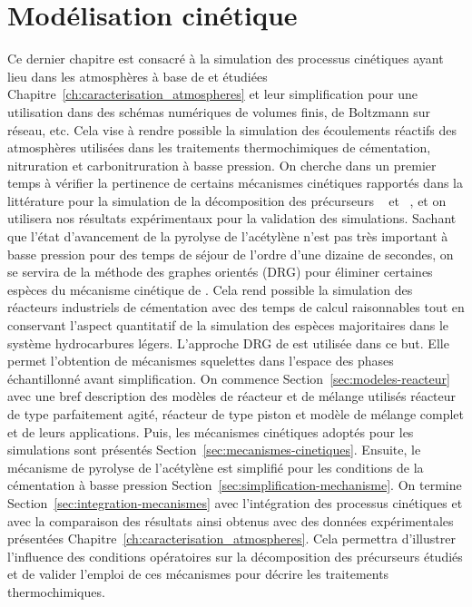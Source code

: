 \chapter{Modélisation cinétique}
\label{ch:modelisation_cinetique}

\vfill

Ce dernier chapitre est consacré à la simulation des processus cinétiques ayant lieu dans les atmosphères à base de  et  étudiées Chapitre~\ref{ch:caracterisation_atmospheres} et leur simplification pour une utilisation dans des schémas numériques de volumes finis, de Boltzmann sur réseau, etc. Cela vise à rendre possible la simulation des écoulements réactifs des atmosphères utilisées dans les traitements thermochimiques de cémentation, nitruration et carbonitruration à basse pression. On cherche dans un premier temps à vérifier la pertinence de certains mécanismes cinétiques rapportés dans la littérature pour la simulation de la décomposition des précurseurs ~\cite{Norinaga2009} et ~\cite{Dirtu2006}, et on utilisera nos résultats expérimentaux pour la validation des simulations. Sachant que l'état d'avancement de la pyrolyse de l'acétylène n'est pas très important à basse pression pour des temps de séjour de l'ordre d'une dizaine de
secondes, on se servira de la méthode des \og{}graphes orientés\fg{} (DRG) pour éliminer certaines espèces du mécanisme cinétique de \citet{Norinaga2009}. Cela rend possible la simulation des réacteurs industriels de cémentation avec des temps de calcul raisonnables tout en conservant l'aspect quantitatif de la simulation des espèces majoritaires dans le système \textemdash{} hydrocarbures légers. L'approche DRG de \citet{Lu2005} est utilisée dans ce but. Elle permet l'obtention de \og{}mécanismes squelettes\fg{} dans l'espace des phases échantillonné avant simplification. On commence Section~\ref{sec:modeles-reacteur} avec une bref description des modèles de réacteur et de mélange utilisés \textendash{} réacteur de type parfaitement agité, réacteur de type piston et modèle de mélange complet \textendash{} et de leurs applications. Puis, les mécanismes cinétiques adoptés pour les simulations sont présentés
Section~\ref{sec:mecanismes-cinetiques}. Ensuite, le mécanisme de pyrolyse de l'acétylène est simplifié pour les conditions de la cémentation à basse pression Section~\ref{sec:simplification-mechanisme}. On termine Section~\ref{sec:integration-mecanismes} avec l'intégration des processus cinétiques et avec la comparaison des résultats ainsi obtenus avec des données expérimentales présentées Chapitre~\ref{ch:caracterisation_atmospheres}. Cela permettra d'illustrer l'influence des conditions opératoires sur la décomposition des précurseurs étudiés et de valider l'emploi de ces mécanismes pour décrire les traitements thermochimiques.

